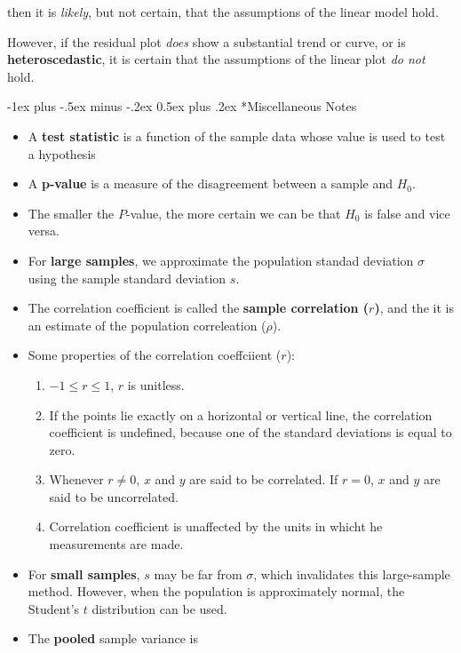 \documentclass[9pt,landscape]{memoir}
\makeatletter
\renewcommand{\section}{\@startsection{section}{1}{0mm}%
    {-1ex plus -.5ex minus -.2ex}%
    {0.5ex plus .2ex}%
{\normalfont\large\bfseries}}
\makeatother
\begin{document}
\begin{multicols}{3}
    then it is \textit{likely}, but not certain, that the assumptions of the linear model hold.

    \vspace{2mm}
    However, if the residual plot \textit{does} show a substantial trend or curve, or is \textbf{heteroscedastic}, it is certain that the assumptions of the linear plot \textit{do not} hold.


    \section*{Miscellaneous Notes}
    \begin{itemize}
        \item A \textbf{test statistic} is a function of the sample data whose value is used to test a hypothesis
        \item A \textbf{p-value} is a measure of the disagreement between a sample and $H_0$.
        \item The smaller the $P$-value, the more certain we can be that $H_0$ is false and vice versa.
        \item For \textbf{large samples}, we approximate the population standad deviation $\sigma$ using the sample standard deviation $s$.
        \item The correlation coefficient is called the \textbf{sample correlation ($r$)}, and the it is an estimate of the population correleation ($\rho$).
        \item Some properties of the correlation coeffciient ($r$):
            \vspace{2mm}
            \begin{enumerate}
                \item $-1 \leq r \leq 1$, $r$ is unitless.
                \item If the points lie exactly on a horizontal or vertical line, the correlation coefficient is undefined, because one of the standard deviations is equal to zero.
                \item Whenever $r \neq 0$, $x$ and $y$ are said to be correlated. If $r = 0$, $x$ and $y$ are said to be uncorrelated.
                \item Correlation coefficient is unaffected by the units in whicht he measurements are made.
            \end{enumerate}
            \vspace{2mm}

        \item For \textbf{small samples}, $s$ may be far from $\sigma$, which invalidates this large-sample method. However, when the population is approximately normal, the Student's $t$ distribution can be used.
        \item The \textbf{pooled} sample variance is


\end{itemize}
\end{multicols}
\end{document}
